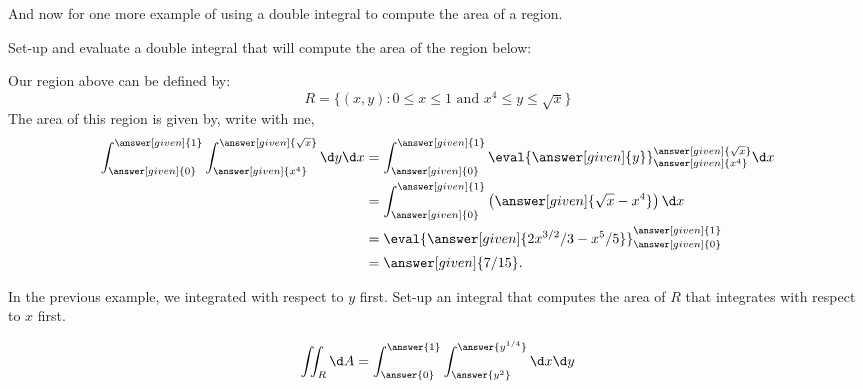 \documentclass{ximera}
\begin{document}
And now for one more example of using a double integral to compute the
area of a region.

\begin{example}
  Set-up and evaluate a double integral that will compute the area of
  the region below:
  \begin{image}
  \end{image}
  \begin{explanation}
    Our region above can be defined by:
    \[
    R=\{(x,y):\text{$0\leq x\leq 1$ and $x^4\leq y\leq \sqrt{x}$}\}
    \]
    The area of this region is given by, write with me, 
    \begin{align*}
      \int_{\answer[given]{0}}^{\answer[given]{1}}\int_{\answer[given]{x^4}}^{\answer[given]{\sqrt{x}}}\d y \d x &= \int_{\answer[given]{0}}^{\answer[given]{1}} \eval{\answer[given]{y}}_{\answer[given]{x^4}}^{\answer[given]{\sqrt{x}}} \d x\\
      &=  \int_{\answer[given]{0}}^{\answer[given]{1}} \left(\answer[given]{\sqrt{x}-x^4}\right) \d x\\
      &=  \eval{\answer[given]{2x^{3/2}/3 - x^5/5}}_{\answer[given]{0}}^{\answer[given]{1}}\\
      &= \answer[given]{7/15}. 
    \end{align*}
  \end{explanation}
\end{example}

\begin{question}
  In the previous example, we integrated with respect to $y$
  first. Set-up an integral that computes the area of $R$ that
  integrates with respect to $x$ first.
  \begin{prompt}
    \[
    \iint_R \d A = \int_{\answer{0}}^{\answer{1}}\int_{\answer{y^2}}^{\answer{y^{1/4}}} \d x \d y
    \]
  \end{prompt}
\end{question}
\end{document}
